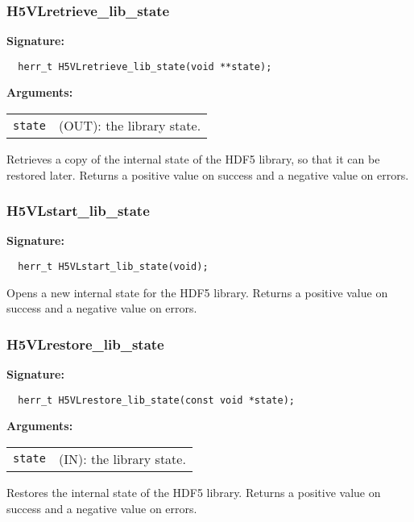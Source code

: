 \subsubsection{H5VLretrieve\_lib\_state}
\begin{mdframed}[style=bgbox]
\textbf{Signature:}
\begin{lstlisting}
  herr_t H5VLretrieve_lib_state(void **state);
\end{lstlisting}
\textbf{Arguments:}\\
\begin{tabular}{l p{13.5cm}}
 {\tt state} & (OUT): the library state.\\
\end{tabular}
\end{mdframed}
Retrieves a copy of the internal state of the HDF5 library,
so that it can be restored later.
Returns a positive value on success and a negative value on errors.
\bigskip


\subsubsection{H5VLstart\_lib\_state}
\begin{mdframed}[style=bgbox]
\textbf{Signature:}
\begin{lstlisting}
  herr_t H5VLstart_lib_state(void);
\end{lstlisting}
\end{mdframed}
Opens a new internal state for the HDF5 library.
Returns a positive value on success and a negative value on errors.
\bigskip


\subsubsection{H5VLrestore\_lib\_state}
\begin{mdframed}[style=bgbox]
\textbf{Signature:}
\begin{lstlisting}
  herr_t H5VLrestore_lib_state(const void *state);
\end{lstlisting}
\textbf{Arguments:}\\
\begin{tabular}{l p{13.5cm}}
 {\tt state} & (IN): the library state.\\
\end{tabular}
\end{mdframed}
Restores the internal state of the HDF5 library.
Returns a positive value on success and a negative value on errors.
\bigskip


